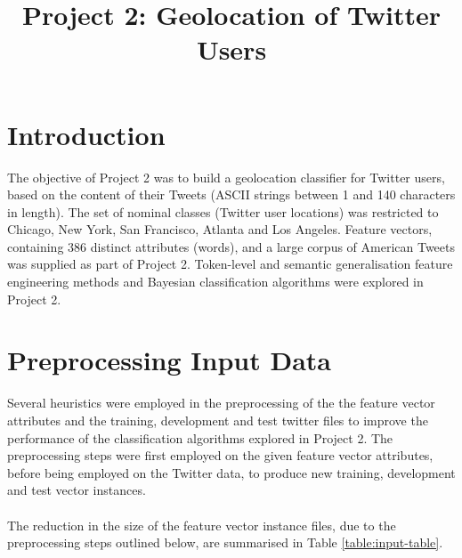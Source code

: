 \documentclass[11pt]{article}
\begin{document}
\title{Project 2: Geolocation of Twitter Users}
\maketitle

\section{Introduction}
The objective of Project 2 was to build a geolocation classifier for Twitter users, based on the content of their Tweets (ASCII strings between 1 and 140 characters in length). The set of nominal classes (Twitter user locations) was restricted to Chicago, New York, San Francisco, Atlanta and Los Angeles. Feature vectors, containing 386 distinct attributes (words), and a large corpus of American Tweets was supplied as part of Project 2. Token-level and semantic generalisation feature engineering methods and Bayesian classification algorithms were explored in Project 2.

\section{Preprocessing Input Data}  

Several heuristics were employed in the preprocessing of the the feature vector attributes and the training, development and test twitter files to improve the performance of the classification algorithms explored in Project 2. The preprocessing steps were first employed on the given feature vector attributes, before being employed on the Twitter data, to produce new training, development and test vector instances.\\\\
The reduction in the size of the feature vector instance files, due to the preprocessing steps outlined below, are summarised in Table \ref{table:input-table}.
\end{document}

